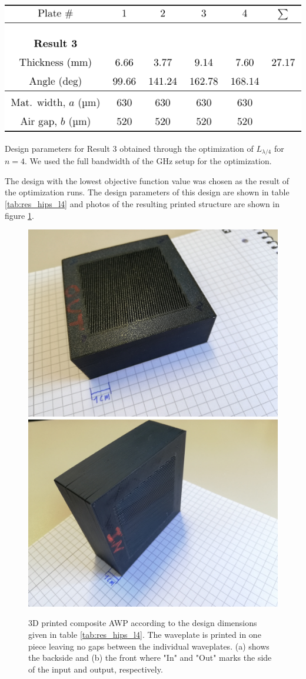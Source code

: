 \begin{table}[ht]
    \centering
    \includegraphics[scale=1.0]{images/results/polymer_result_table.pdf}
    \caption{Design parameters for Result 3 obtained through the optimization of $L_{\lambda/4}$ for $n=4$. We used the full bandwidth of the GHz setup for the optimization.}
    \label{tab:res_hips_l4}
\end{table}

The design with the lowest objective function value was chosen as the result of the optimization runs. The design parameters of this design are shown in table \ref{tab:res_hips_l4} and photos of the resulting printed structure are shown in figure \ref{fig:sent2david}.

\begin{figure}[H]
    \centering
    \subcaptionbox{\label{fig:sent2david_1}}
        {\includegraphics[width=0.35\linewidth]{images/results/polymer/sent2david_1.jpg}}
    \subcaptionbox{\label{fig:sent2david_2}}
        {\includegraphics[width=0.35\linewidth]{images/results/polymer/sent2david_2.jpg}}
    \caption{3D printed composite AWP according to the design dimensions given in table \ref{tab:res_hips_l4}. The waveplate is printed in one piece leaving no gaps between the individual waveplates. (a) shows the backside and (b) the front where "In" and "Out" marks the side of the input and output, respectively.}
    \label{fig:sent2david}
\end{figure}

